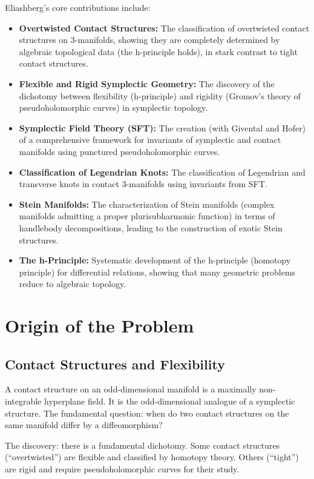 Eliashberg's core contributions include:
\begin{itemize}
    \item \textbf{Overtwisted Contact Structures:} The classification of overtwisted contact structures on 3-manifolds, showing they are completely determined by algebraic topological data (the h-principle holds), in stark contrast to tight contact structures.
    \item \textbf{Flexible and Rigid Symplectic Geometry:} The discovery of the dichotomy between flexibility (h-principle) and rigidity (Gromov's theory of pseudoholomorphic curves) in symplectic topology.
    \item \textbf{Symplectic Field Theory (SFT):} The creation (with Givental and Hofer) of a comprehensive framework for invariants of symplectic and contact manifolds using punctured pseudoholomorphic curves.
    \item \textbf{Classification of Legendrian Knots:} The classification of Legendrian and transverse knots in contact 3-manifolds using invariants from SFT.
    \item \textbf{Stein Manifolds:} The characterization of Stein manifolds (complex manifolds admitting a proper plurisubharmonic function) in terms of handlebody decompositions, leading to the construction of exotic Stein structures.
    \item \textbf{The h-Principle:} Systematic development of the h-principle (homotopy principle) for differential relations, showing that many geometric problems reduce to algebraic topology.
\end{itemize}

\section{Origin of the Problem}

\subsection{Contact Structures and Flexibility}

A contact structure on an odd-dimensional manifold is a maximally non-integrable hyperplane field. It is the odd-dimensional analogue of a symplectic structure. The fundamental question: when do two contact structures on the same manifold differ by a diffeomorphism?

The discovery: there is a fundamental dichotomy. Some contact structures (``overtwisted'') are flexible and classified by homotopy theory. Others (``tight'') are rigid and require pseudoholomorphic curves for their study.

